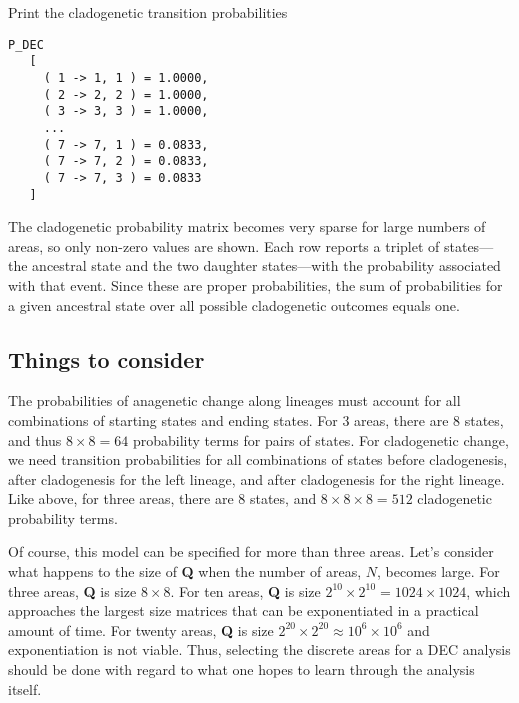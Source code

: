 Print the cladogenetic transition probabilities

\begin{snugshade}
\begin{lstlisting}
P_DEC
   [
     ( 1 -> 1, 1 ) = 1.0000,
     ( 2 -> 2, 2 ) = 1.0000,
     ( 3 -> 3, 3 ) = 1.0000,
     ...
     ( 7 -> 7, 1 ) = 0.0833,
     ( 7 -> 7, 2 ) = 0.0833,
     ( 7 -> 7, 3 ) = 0.0833
   ]
\end{lstlisting}
\end{snugshade}

The cladogenetic probability matrix becomes very sparse for large numbers of areas, so only non-zero values are shown.
Each row reports a triplet of states---the ancestral state and the two daughter states---with the probability associated with that event.
Since these are proper probabilities, the sum of probabilities for a given ancestral state over all possible cladogenetic outcomes equals one.

\subsection*{Things to consider}

The probabilities of anagenetic change along lineages must account for all combinations of starting states and ending states.
For 3 areas, there are 8 states, and thus $8 \times 8 = 64$ probability terms for pairs of states.
For cladogenetic change, we need transition probabilities for all combinations of states before cladogenesis, after cladogenesis for the left lineage, and after cladogenesis for the right lineage.
Like above, for three areas, there are 8 states, and $8 \times 8 \times 8 = 512$ cladogenetic probability terms.

Of course, this model can be specified for more than three areas.
Let's consider what happens to the size of \textbf{Q} when the number of areas, $N$, becomes large.
For three areas, \textbf{Q} is size $8 \times 8$.
For ten areas, \textbf{Q} is size $2^{10} \times 2^{10} = 1024 \times 1024$, which approaches the largest size matrices that can be exponentiated in a practical amount of time.
For twenty areas, \textbf{Q} is size $2^{20} \times 2^{20} \approx 10^6 \times 10^6$ and exponentiation is not viable.
Thus, selecting the discrete areas for a DEC analysis should be done with regard to what one hopes to learn through the analysis itself.


